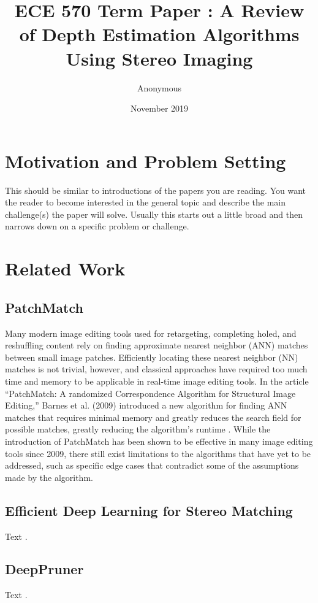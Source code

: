 \documentclass{article}
\title{ECE 570 Term Paper : A Review of Depth Estimation Algorithms Using Stereo Imaging}
\author{Anonymous}
\date{November 2019}
\begin{document}
\maketitle

\section{Motivation and Problem Setting}
This should be similar to introductions of the papers you are reading.  You want the reader to become interested in the general topic and describe the main challenge(s) the paper will solve.  Usually this starts out a little broad and then narrows down on a specific problem or challenge.

\section{Related Work}
\subsection{PatchMatch}
Many modern image editing tools used for retargeting, completing holed, and reshuffling content rely on finding approximate nearest neighbor (ANN) matches between small image patches. Efficiently locating these nearest neighbor (NN) matches is not trivial, however, and classical approaches have required too much time and memory to be applicable in real-time image editing tools. In the article “PatchMatch: A randomized Correspondence Algorithm for Structural Image Editing,” Barnes et al. (2009) introduced a new algorithm for finding ANN matches that requires minimal memory and greatly reduces the search field for possible matches, greatly reducing the algorithm’s runtime \citep{barnes2009patchmatch}. While the introduction of PatchMatch has been shown to be effective in many image editing tools since 2009, there still exist limitations to the algorithms that have yet to be addressed, such as specific edge cases that contradict some of the assumptions made by the algorithm.
\subsection{Efficient Deep Learning for Stereo Matching}
Text \citep{luo2016efficient}.
\subsection{DeepPruner}
Text \citep{duggal2019deeppruner}.
\end{document}
